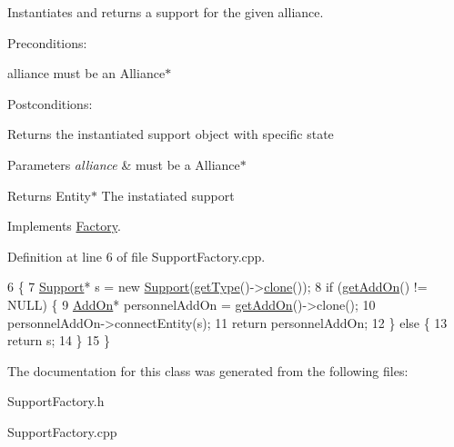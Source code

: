 Instantiates and returns a support for the given alliance. 

Preconditions\+:
\begin{DoxyItemize}
\item alliance must be an Alliance$\ast$
\end{DoxyItemize}

Postconditions\+:
\begin{DoxyItemize}
\item Returns the instantiated support object with specific state
\end{DoxyItemize}


\begin{DoxyParams}{Parameters}
{\em alliance} & must be a Alliance$\ast$ \\
\hline
\end{DoxyParams}
\begin{DoxyReturn}{Returns}
Entity$\ast$ The instatiated support 
\end{DoxyReturn}


Implements \hyperlink{classFactory}{Factory}.



Definition at line 6 of file Support\+Factory.\+cpp.


\begin{DoxyCode}
6                                                        \{
7     \hyperlink{classSupport}{Support}* s = \textcolor{keyword}{new} \hyperlink{classSupport}{Support}(\hyperlink{classFactory_ac91051006ace7ec5bb6ecf0fe6d02d58}{getType}()->\hyperlink{classSupportFactory_a802c25e901b479656ea95a5678a1ad26}{clone}());
8     \textcolor{keywordflow}{if} (\hyperlink{classFactory_a994153930f59cafb280e91d5b100b5aa}{getAddOn}() != NULL) \{
9         \hyperlink{classAddOn}{AddOn}* personnelAddOn = \hyperlink{classFactory_a994153930f59cafb280e91d5b100b5aa}{getAddOn}()->clone();
10         personnelAddOn->connectEntity(s);
11         \textcolor{keywordflow}{return} personnelAddOn;
12     \} \textcolor{keywordflow}{else} \{
13         \textcolor{keywordflow}{return} s;
14     \}
15 \}
\end{DoxyCode}


The documentation for this class was generated from the following files\+:\begin{DoxyCompactItemize}
\item 
Support\+Factory.\+h\item 
Support\+Factory.\+cpp\end{DoxyCompactItemize}
